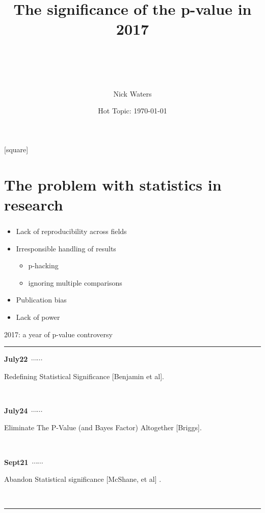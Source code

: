 \documentclass[10pt, compress]{beamer}
\title{The significance of the p-value in 2017}
\date{\footnotesize{ Hot Topic: \today}}
\author{
\\ \\ \\ \\ \large{Nick Waters}}
\institute{
National University of Ireland, Galway\\
James Hutton Institute, Dundee}
\newcommand\ytl[2]{
\parbox[b]{8em}{\hfill{\color{cyan}\bfseries\sffamily #1}~$\cdots\cdots$~}\makebox[0pt][c]{$\bullet$}\vrule\quad \parbox[c]{4.5cm}{\vspace{7pt}\color{red!40!black!30}\raggedright\sffamily #2.\\[7pt]}\\[-3pt]}
\begin{document}
\maketitle

{}[square]

\section{The problem with statistics in research}

\begin{frame}[fragile]
  \frametitle{}
  \begin{itemize}
  \item Lack of reproducibility across fields
  \item Irresponsible handling of results
    \begin{itemize}
    \item p-hacking
    \item ignoring multiple comparisons
      \end{itemize}
  \item Publication bias
  \item Lack of power
  \end{itemize}
\end{frame}


\begin{frame}{2017: a year of p-value controversy }
\begin{table}
\centering
\begin{minipage}[t]{.7\linewidth}
\color{gray}
\rule{\linewidth}{1pt}
\ytl{July22}{Redefining Statistical Significance [Benjamin et al]}
\ytl{July24}{Eliminate The P-Value (and Bayes Factor) Altogether [Briggs]}
\ytl{Sept21}{Abandon Statistical significance [McShane, et al] }
\bigskip
\rule{\linewidth}{1pt}%
\end{minipage}%
\end{table}
\end{frame}
\end{document}
